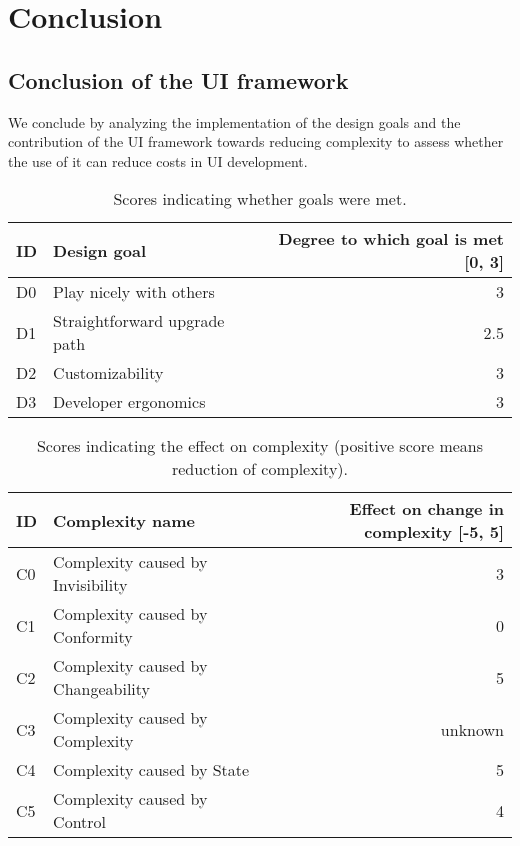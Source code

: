 \section{Conclusion}\label{conclusion}

\subsection{Conclusion of the UI framework}
We conclude by analyzing the implementation of the design goals and the contribution of the UI framework towards reducing complexity to assess whether the use of it can reduce costs in UI development.

\begin{table}[]
  \begin{center}
    \begin{tabular}{|l|l|r|}
      \hline
      ID & Design goal & Degree to which goal is met [0, 3] \\
      \hline
      D0 & Play nicely with others & 3 \\
      D1 & Straightforward upgrade path & 2.5 \\
      D2 & Customizability & 3 \\
      D3 & Developer ergonomics & 3 \\
      \hline
    \end{tabular}
    \caption{Scores indicating whether goals were met.}
  \end{center}
\end{table}

\begin{table}[]
  \begin{center}
    \begin{tabular}{|l|l|r|}
      \hline
      ID & Complexity name & Effect on change in complexity [-5, 5] \\
      \hline
      C0 & Complexity caused by Invisibility & 3 \\
      C1 & Complexity caused by Conformity & 0 \\
      C2 & Complexity caused by Changeability & 5 \\
      C3 & Complexity caused by Complexity & unknown \\
      C4 & Complexity caused by State & 5 \\
      C5 & Complexity caused by Control & 4 \\
      \hline
    \end{tabular}
    \caption{Scores indicating the effect on complexity (positive score means reduction of complexity).}
    \label{tab:summarycomplexity}
  \end{center}
\end{table}

